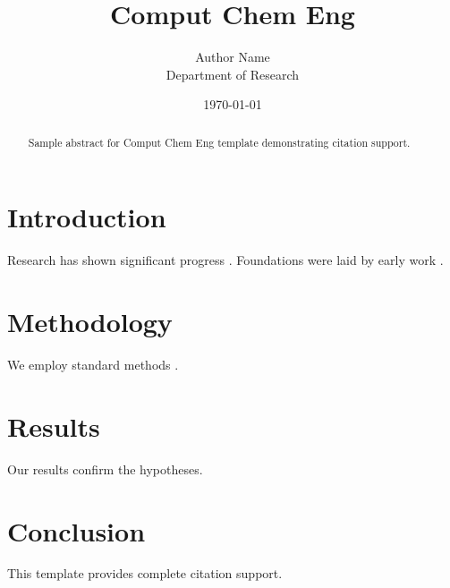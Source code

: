 ﻿\documentclass{elsarticle}
\title{Comput Chem Eng}
\author{Author Name \\ \small Department of Research}
\date{\today}
\begin{document}
\maketitle

\begin{abstract}
Sample abstract for Comput Chem Eng template demonstrating citation support.
\end{abstract}

\section{Introduction}
Research has shown significant progress \citep{einstein1905}. Foundations were laid by early work \citep{turing1950}.

\section{Methodology}
We employ standard methods \citep{knuth1984}.

\section{Results}
Our results confirm the hypotheses.

\section{Conclusion}
This template provides complete citation support.



\end{document}
